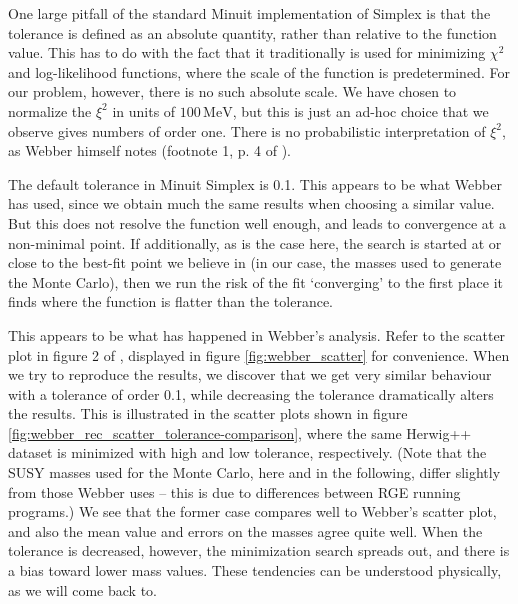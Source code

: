 \documentclass[twoside,english]{uiofysmaster}
\begin{document}
One large pitfall of the standard Minuit implementation of Simplex is that the tolerance is defined as an absolute quantity, rather than relative to the function value. This has to do with the fact that it traditionally is used for minimizing $\chi^2$ and log-likelihood functions, where the scale of the function is predetermined. For our problem, however, there is no such absolute scale. We have chosen to normalize the $\xi^2$ in units of $100 \, \mathrm{MeV}$, but this is just an ad-hoc choice that we observe gives numbers of order one. There is no probabilistic interpretation of $\xi^2$, as Webber himself notes (footnote 1, p. 4 of \cite{Webber:2009vm}). 

The default tolerance in Minuit Simplex is 0.1.  This appears to be what Webber has used, since we obtain much the same results when choosing a similar value. But this does not resolve the function well enough, and leads to convergence at a non-minimal point. If additionally, as is the case here, the search is started at or close to the best-fit point we believe in (in our case, the masses used to generate the Monte Carlo), then we run the risk of the fit `converging' to the first place it finds where the function is flatter than the tolerance. 

This appears to be what has happened in Webber's analysis. Refer to the scatter plot in figure 2 of \cite{Webber:2009vm}, displayed in figure \ref{fig:webber_scatter} for convenience. When we try to reproduce the results, we discover that we get very similar behaviour with a tolerance of order 0.1, while decreasing the tolerance dramatically alters the results. This is illustrated in the scatter plots shown in figure \ref{fig:webber_rec_scatter_tolerance-comparison}, where the same Herwig++ dataset is minimized with high and low tolerance, respectively. (Note that the SUSY masses used for the Monte Carlo, here and in the following, differ slightly from those Webber uses -- this is due to differences between RGE running programs.) We see that the former case compares well to Webber's scatter plot, and also the mean value and errors on the masses agree quite well. When the tolerance is decreased, however, the minimization search spreads out, and there is a bias toward lower mass values. These tendencies can be understood physically, as we will come back to. 
\end{document}
